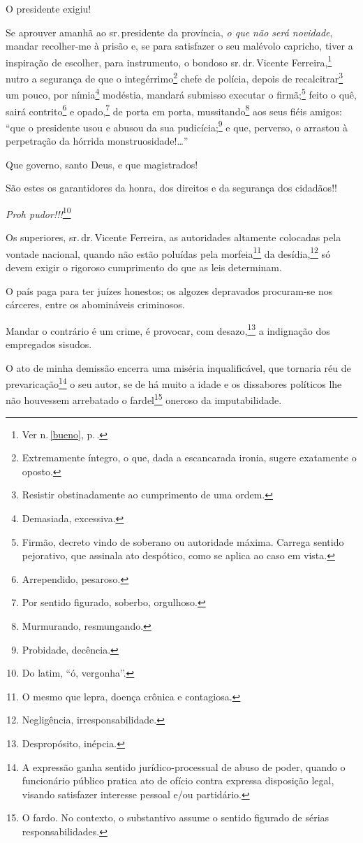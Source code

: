 O presidente exigiu!

Se aprouver amanhã ao sr.\,presidente da província, \emph{o que não será
novidade}, mandar recolher-me à prisão e, se para satisfazer o seu
malévolo capricho, tiver a inspiração de escolher, para instrumento, o
bondoso sr.\,dr.\,Vicente Ferreira,\footnote{Ver n.\,\ref{bueno}, p.\,\pageref{bueno}.} nutro a segurança de que o
integérrimo\footnote{Extremamente íntegro, o que, dada a escancarada
  ironia, sugere exatamente o oposto.} chefe de polícia, depois de
recalcitrar\footnote{Resistir obstinadamente ao cumprimento de uma
  ordem.} um pouco, por nímia\footnote{Demasiada, excessiva.}
modéstia, mandará submisso executar o firmã;\footnote{Firmão, decreto
  vindo de soberano ou autoridade máxima. Carrega sentido pejorativo,
  que assinala ato despótico, como se aplica ao caso em vista.} feito o
quê, sairá contrito\footnote{Arrependido, pesaroso.} e
opado,\footnote{Por sentido figurado, soberbo, orgulhoso.} de porta em
porta, mussitando\footnote{Murmurando, resmungando.} aos seus fiéis
amigos: ``que o presidente usou e abusou da sua pudicícia;\footnote{
  Probidade, decência.} e que, perverso, o arrastou à perpetração da
hórrida monstruosidade!\ldots{}''

Que governo, santo Deus, e que magistrados!

São estes os garantidores da honra, dos direitos e da segurança dos
cidadãos!!

\emph{Proh pudor!!!}\footnote{Do latim, ``ó, vergonha''.}

Os superiores, sr.\,dr.\,Vicente Ferreira, as autoridades altamente
colocadas pela vontade nacional, quando não estão poluídas pela
morfeia\footnote{O mesmo que lepra, doença crônica e contagiosa.} da
desídia,\footnote{Negligência, irresponsabilidade.} só devem exigir o
rigoroso cumprimento do que as leis determinam.

O país paga para ter juízes honestos; os algozes depravados procuram-se
nos cárceres, entre os abomináveis criminosos.

Mandar o contrário é um crime, é provocar, com desazo,\footnote{
  Despropósito, inépcia.} a indignação dos empregados sisudos.

O ato de minha demissão encerra uma miséria inqualificável, que tornaria
réu de prevaricação\footnote{A expressão ganha sentido
  jurídico-processual de abuso de poder, quando o funcionário público
  pratica ato de ofício contra expressa disposição legal, visando
  satisfazer interesse pessoal e/ou partidário.} o seu autor, se de há
muito a idade e os dissabores políticos lhe não houvessem arrebatado o
fardel\footnote{O fardo. No contexto, o substantivo assume o sentido
  figurado de sérias responsabilidades.} oneroso da imputabilidade.

